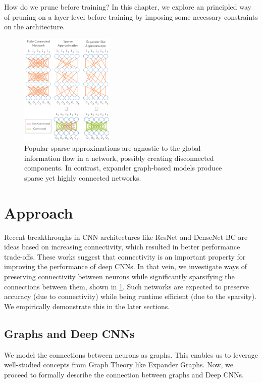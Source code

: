 \noindent How do we prune before training? In this chapter, we explore an principled way of pruning on a layer-level before training by imposing some necessary constraints on the architecture.
\begin{figure}[h]
\centering
\includegraphics[width=0.4\textwidth]{figures/Expander2.png}
\caption{Popular sparse approximations are agnostic to the global information flow in a network, possibly creating disconnected components. In contrast, expander graph-based models produce sparse yet highly connected networks.}
\label{fig:intro}
\end{figure}

\section{Approach}\label{sec:approach}
\noindent Recent breakthroughs in CNN architectures like ResNet\cite{he2016deep} and DenseNet-BC\cite{huang2017densely} are ideas  based on increasing connectivity, which resulted in better performance trade-offs. These works suggest that connectivity is an important property for improving the performance of deep CNNs. In that vein, we investigate ways of preserving connectivity between neurons while significantly sparsifying the connections between them, shown in \ref{fig:intro}. Such networks are expected to preserve accuracy (due to connectivity) while being runtime efficient (due to the sparsity). We empirically demonstrate this in the later sections.

\subsection{Graphs and Deep CNNs}

\noindent We model the connections between neurons as graphs. This enables us to leverage well-studied concepts from Graph Theory like Expander Graphs. Now, we proceed to formally describe the connection between graphs and Deep CNNs.\\ 

